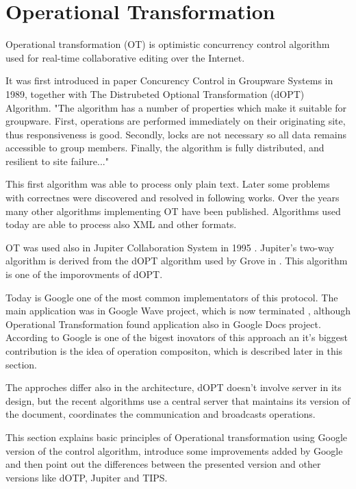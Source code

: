 \documentclass[12pt,oneside]{fithesis2}
\begin{document}
\section{Operational Transformation}
\par Operational transformation (OT) is optimistic concurrency control algorithm used for real-time collaborative editing over the Internet. 
\par It was first introduced in paper Concurency Control in Groupware Systems \cite{Ellis} in 1989, together with The Distrubeted Optional Transformation (dOPT) Algorithm. "The algorithm has a number of properties which make it suitable for groupware. First, operations are performed immediately on their originating site, thus responsiveness is good. Secondly, locks are not necessary so all data remains accessible to group members. Finally, the algorithm is fully distributed, and resilient to site failure..."\cite{Ellis} \par This first algorithm was able to process only plain text. Later some problems with correctnes were discovered and resolved in following works. Over the years many other algorithms implementing OT have been published. Algorithms used today are able to process also XML and other formats. \par OT was used also in Jupiter Collaboration System in 1995 \cite{Jupiter}. Jupiter's two-way algorithm is derived from the dOPT algorithm used by Grove in \cite{Ellis}. This algorithm is one of the imporovments of dOPT. \par Today is Google one of the most common implementators of this protocol. The main application was in Google Wave project, which is now terminated , although Operational Transformation found application also in Google Docs project. According to \cite{Spiewak} Google is one of the bigest inovators of this approach an it's biggest contribution is the idea of operation compositon, which is described later in this section. \par The approches differ also in the architecture, dOPT doesn't involve server in its design, but the recent algorithms use a central server that maintains its version of the document, coordinates the communication and broadcasts operations.
\par This section explains basic principles of Operational transformation using Google version of the control algorithm, introduce some improvements added by Google and then point out the differences between the presented version and other versions like dOTP, Jupiter and TIPS. 
\end{document}
